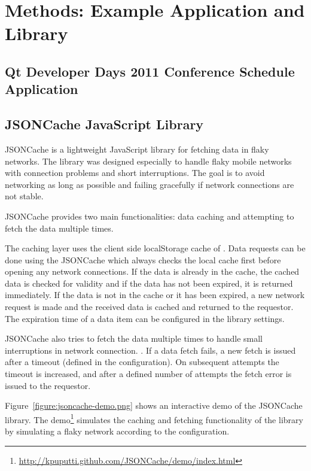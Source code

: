 \chapter{Methods: Example Application and Library}
\label{chapter:methods}

\section{Qt Developer Days 2011 Conference Schedule Application}
\label{section:devdays}

\section{JSONCache JavaScript Library}
\label{section:jsoncache}

JSONCache is a lightweight JavaScript library for fetching 
data in flaky networks. The library was designed especially to handle
flaky mobile networks with connection problems and short
interruptions. The goal is to avoid networking as long as possible and
failing gracefully if network connections are not stable.

JSONCache provides two main functionalities: data caching and
attempting to fetch the data multiple times.

The caching layer uses the client side localStorage \citationneeded
cache of . Data requests can be done using the JSONCache
 which always checks the local cache first before opening
any network connections. If the data is already in the cache, the
cached data is checked for validity and if the data has not been
expired, it is returned immediately. If the data is not in the cache
or it has been expired, a new network request is made and the received
data is cached and returned to the requestor. The expiration time of a
data item can be configured in the library settings.

JSONCache also tries to fetch the data multiple times to handle small
interruptions in network connection. . If a data fetch fails, a new fetch is
issued after a timeout (defined in the configuration). On subsequent
attempts the timeout is increased, and after a defined number of
attempts the fetch error is issued to the requestor.

Figure~\ref{figure:jsoncache-demo.png} shows an interactive demo of
the JSONCache library. The
demo\footnote{\url{http://kpuputti.github.com/JSONCache/demo/index.html}}
simulates the caching and fetching functionality of the library by
simulating a flaky network according to the configuration.


